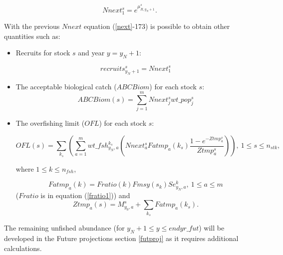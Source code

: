 \documentclass{article}
\begin{document}
\begin{equation}
    Nnext^s_1=e^{\mu^s_{R,y_N+1}}.
\end{equation}

With the previous $Nnext$ equation (\ref{next}-173) is possible to obtain other quantities such as:  
\begin{itemize}
\item Recruits for stock $s$ and year $y=y_N+1$: 

\begin{equation}
recruits^s_{y_N+1}=Nnext^s_1
\end{equation}

\item The acceptable biological catch ($ABCBiom$) for each stock $s$:
\begin{equation}
    ABCBiom(s) = \sum_{j=1}^mNnext^s_jwt\_pop^s_j
\end{equation}


\item The overfishing limit ($OFL$) for each stock $s$:

\begin{equation}
    OFL(s) =\sum_{k_s} \left(\sum_{a=1}^mwt\_fsh^{k_s}_{y_N,a} \left(Nnext_a^s Fatmp_a(k_s) \dfrac{1 - e^{-Ztmp^s_a}}{Ztmp^s_a}\right)\right), \ 1\leq s \leq n_{stk},
\end{equation}

where $1\leq k \leq n_{fsh}$,

\begin{equation}
    Fatmp_a(k)=Fratio(k) Fmsy(s_k) Se^k_{y_N,a}, \  1\leq a \leq m
\end{equation}
($Fratio$ is in equation (\ref{fratio1})) and
\begin{equation}
    Ztmp_a(s)=M^s_{y_0,a}+ \sum_{k_s}Fatmp_a(k_s).
\end{equation}
\end{itemize}

The remaining unfished abundance (for $ y_N+1\leq y\leq endyr\_fut$) will be developed in the Future projections section \ref{futproj} as it requires additional calculations.
\end{document}
